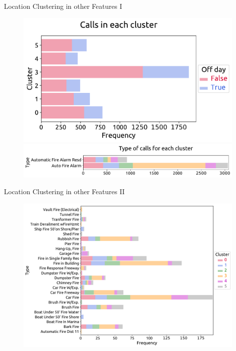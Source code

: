 \documentclass[t,11pt,compress,xcolor=table,hyperref={bookmarks=false}]{beamer}
\begin{document}
\begin{frame}{Location Clustering in other Features I}

\begin{figure}
\includegraphics[scale=0.35]{figs/STORY_loc_off_days.pdf}
\hspace*{-0.9cm}\includegraphics[scale=0.35]{figs/STORY_loc_type_1.pdf}
\end{figure}
\end{frame}

\begin{frame}{Location Clustering in other Features II}
\vspace*{-0.3cm}
\begin{figure}
\hspace*{-0.9cm}\includegraphics[scale=0.35]{figs/STORY_loc_type_2.pdf}
\end{figure}
\end{frame}
\end{document}
